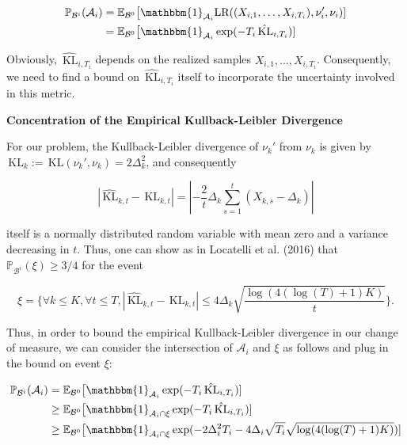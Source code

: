 \documentclass[11pt,]{article}
\newcommand{\KL}{\,\text{KL}}
\begin{document}
\begin{align*}
\mathbb{P}_{\mathcal{B}^i}(\mathcal{A}_i) & = \mathbb{E}_{\mathcal{B}^0} \big[\mathbbm{1}_{\mathcal{A}_i} \text{LR}((X_{i,1}, \dots,X_{i,T_i}), \nu_i', \nu_i) ] \\
& = \mathbb{E}_{\mathcal{B}^0} \big[\mathbbm{1}_{\mathcal{A}_i} \exp (- T_i \hat{\KL}_{i,T_i}) ]
\end{align*}

Obviously, \(\hat{\KL}_{i,T_i}\) depends on the realized samples
\(X_{i,1}, \dots,X_{i,T_i}\). Consequently, we need to find a bound on
\(\hat{\KL}_{i,T_i}\) itself to incorporate the uncertainty involved in
this metric.

\textbf{Concentration of the Empirical Kullback-Leibler Divergence}

For our problem, the Kullback-Leibler divergence of \(\nu_k'\) from
\(\nu_k\) is given by \(\KL_k := \KL(\nu_k', \nu_k) = 2\Delta_k^2\), and
consequently

\begin{equation*}
|\hat{\KL}_{k,t} - \KL_{k,t}| = |-\frac{2}{t} \Delta_k \sum_{s=1}^{t}(X_{k,s} - \Delta_k)|
\end{equation*}

itself is a normally distributed random variable with mean zero and a
variance decreasing in \(t\). Thus, one can show as in Locatelli et al.
(2016) that \(\mathbb{P}_{\mathcal{B}^i}(\xi) \geq 3/4\) for the event

\begin{equation}
\xi = \{ \forall k \leq K, \forall t \leq T, |\hat{\KL}_{k,t} - \KL_{k,t}| \leq 4 \Delta_k \sqrt{\frac{\log(4(\log(T)+1)K)}{t}}\}. \label{LocatelliTheorem1EventXi}
\end{equation}

Thus, in order to bound the empirical Kullback-Leibler divergence in our
change of measure, we can consider the intersection of \(\mathcal{A}_i\)
and \(\xi\) as follows and plug in the bound on event \(\xi\):

\begin{align*}
\mathbb{P}_{\mathcal{B}^i}(\mathcal{A}_i) & = \mathbb{E}_{\mathcal{B}^0} \big[\mathbbm{1}_{\mathcal{A}_i} \exp (- T_i \hat{\KL}_{i,T_i}) ] \\
& \geq \mathbb{E}_{\mathcal{B}^0} \big[\mathbbm{1}_{\mathcal{A}_i \cap \xi} \exp (- T_i \hat{\KL}_{i,T_i}) ] \\
& \geq \mathbb{E}_{\mathcal{B}^0} \big[\mathbbm{1}_{\mathcal{A}_i \cap \xi} \exp (- 2 \Delta_i^2 T_i - 4 \Delta_i \sqrt{T_i} \sqrt{\log(4(\log(T)+1)K)}) ]
\end{align*}
\end{document}

